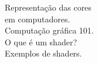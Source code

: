\documentclass[preview]{standalone}
\begin{document}
Representação das cores \\ em computadores.\\Computação gráfica 101.\\O que é um shader?\\Exemplos de shaders.\\
\end{document}
